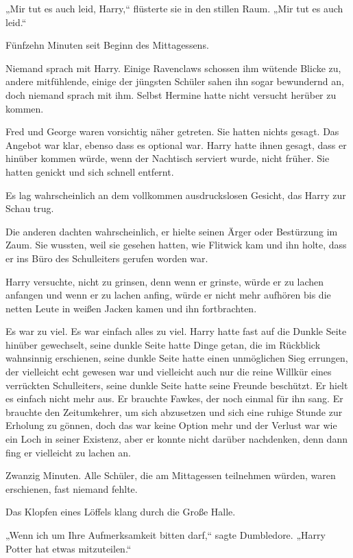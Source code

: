 {„Mir tut es auch leid, Harry,“ flüsterte sie in den stillen Raum. „Mir tut es auch leid.“

\later

Fünfzehn Minuten seit Beginn des Mittagessens.

Niemand sprach mit Harry. Einige Ravenclaws schossen ihm wütende Blicke zu, andere mitfühlende, einige der jüngsten Schüler sahen ihn sogar bewundernd an, doch niemand sprach mit ihm. Selbst Hermine hatte nicht versucht herüber zu kommen.

Fred und George waren vorsichtig näher getreten. Sie hatten nichts gesagt. Das Angebot war klar, ebenso dass es optional war. Harry hatte ihnen gesagt, dass er hinüber kommen würde, wenn der Nachtisch serviert wurde, nicht früher. Sie hatten genickt und sich schnell entfernt.

Es lag wahrscheinlich an dem vollkommen ausdruckslosen Gesicht, das Harry zur Schau trug.

Die anderen dachten wahrscheinlich, er hielte seinen Ärger oder Bestürzung im Zaum. Sie wussten, weil sie gesehen hatten, wie Flitwick kam und ihn holte, dass er ins Büro des Schulleiters gerufen worden war.

Harry versuchte, nicht zu grinsen, denn wenn er grinste, würde er zu lachen anfangen und wenn er zu lachen anfing, würde er nicht mehr aufhören bis die netten Leute in weißen Jacken kamen und ihn fortbrachten.

Es war zu viel. Es war einfach alles zu viel. Harry hatte fast auf die Dunkle Seite hinüber gewechselt, seine dunkle Seite hatte Dinge getan, die im Rückblick wahnsinnig erschienen, seine dunkle Seite hatte einen unmöglichen Sieg errungen, der vielleicht echt gewesen war und vielleicht auch nur die reine Willkür eines verrückten Schulleiters, seine dunkle Seite hatte seine Freunde beschützt. Er hielt es einfach nicht mehr aus. Er brauchte Fawkes, der noch einmal für ihn sang. Er brauchte den Zeitumkehrer, um sich abzusetzen und sich eine ruhige Stunde zur Erholung zu gönnen, doch das war keine Option mehr und der Verlust war wie ein Loch in seiner Existenz, aber er konnte nicht darüber nachdenken, denn dann fing er vielleicht zu lachen an.

Zwanzig Minuten. Alle Schüler, die am Mittagessen teilnehmen würden, waren erschienen, fast niemand fehlte.

Das Klopfen eines Löffels klang durch die Große Halle.

„Wenn ich um Ihre Aufmerksamkeit bitten darf,“ sagte Dumbledore. „Harry Potter hat etwas mitzuteilen.“

}
